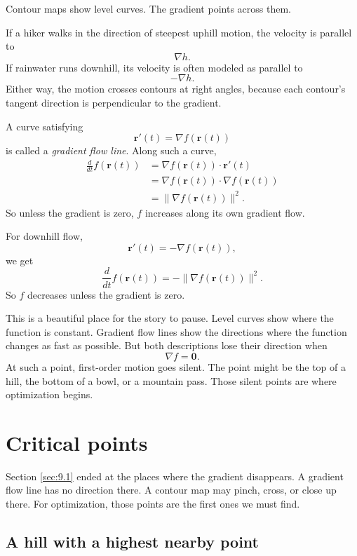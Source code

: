Contour maps show level curves.  The gradient points across them.

If a hiker walks in the direction of steepest uphill motion, the velocity is parallel to
\[
    \nabla h.
\]
If rainwater runs downhill, its velocity is often modeled as parallel to
\[
    -\nabla h.
\]
Either way, the motion crosses contours at right angles, because each contour's tangent
direction is perpendicular to the gradient.

A curve satisfying
\[
    \mathbf r'(t)=\nabla f(\mathbf r(t))
\]
is called a \emph{gradient flow line}.  Along such a curve,
\[
\begin{aligned}
    \frac{d}{dt}f(\mathbf r(t))
    &=
    \nabla f(\mathbf r(t))\cdot \mathbf r'(t)\\
    &=
    \nabla f(\mathbf r(t))\cdot \nabla f(\mathbf r(t))\\
    &=
    \|\nabla f(\mathbf r(t))\|^2.
\end{aligned}
\]
So unless the gradient is zero, \(f\) increases along its own gradient flow.

For downhill flow,
\[
    \mathbf r'(t)=-\nabla f(\mathbf r(t)),
\]
we get
\[
    \frac{d}{dt}f(\mathbf r(t))
    =
    -\|\nabla f(\mathbf r(t))\|^2.
\]
So \(f\) decreases unless the gradient is zero.

This is a beautiful place for the story to pause.  Level curves show where the function
is constant.  Gradient flow lines show the directions where the function changes as fast
as possible.  But both descriptions lose their direction when
\[
    \nabla f=\mathbf 0.
\]
At such a point, first-order motion goes silent.  The point might be the top of a hill,
the bottom of a bowl, or a mountain pass.  Those silent points are where optimization
begins.

\section{Critical points}
\label{sec:9.2}

Section \ref{sec:9.1} ended at the places where the gradient disappears.  A gradient
flow line has no direction there.  A contour map may pinch, cross, or close up there.
For optimization, those points are the first ones we must find.

\subsection{A hill with a highest nearby point}

